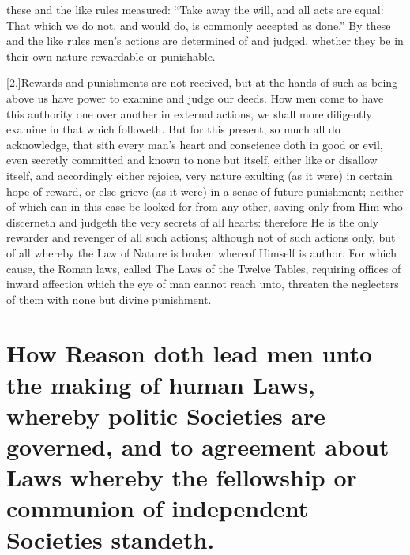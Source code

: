 these and the like rules measured: “Take away the will, and all acts are equal: That which we do not, and would do, is commonly accepted as done.” By these and the like rules men’s actions are determined of and judged, whether they be in their own nature rewardable or punishable.

[2.]Rewards and punishments are not received, but at the hands of such as being above us have power to examine and judge our deeds. How men come to have this authority one over another in external actions, we shall more diligently examine in that which followeth. But for this present, so much all do acknowledge, that sith every man’s heart and conscience doth in good or evil, even secretly committed and known to none but itself, either like or disallow itself, and accordingly either rejoice, very nature exulting (as it were) in certain hope of reward, or else grieve (as it were) in a sense of future punishment; neither of which can in this case be looked for from any other, saving only from Him who discerneth and judgeth the very secrets of all hearts:  therefore He is the only rewarder and revenger of all such actions; although not of such actions only, but of all whereby the Law of Nature is broken whereof Himself is author. For which cause, the Roman laws, called The Laws of the Twelve Tables, requiring offices of inward affection which the eye of man cannot reach unto, threaten the neglecters of them with none but divine punishment.

\section*{How Reason doth lead men unto the making of human Laws, whereby politic Societies are governed, and to agreement about Laws whereby the fellowship or communion of independent Societies standeth.}

